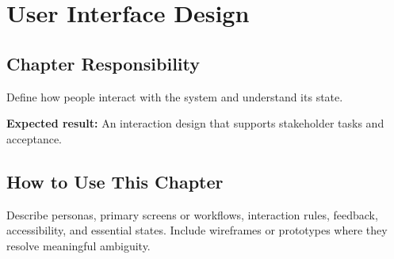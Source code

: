 \chapter{User Interface Design}
\section{Chapter Responsibility}
\label{Section:UserInterfaceDesignResponsibility}
Define how people interact with the system and understand its state.

\noindent\textbf{Expected result:} An interaction design that supports stakeholder tasks and acceptance.

\section{How to Use This Chapter}
Describe personas, primary screens or workflows, interaction rules, feedback, accessibility, and essential states. Include wireframes or prototypes where they resolve meaningful ambiguity.
